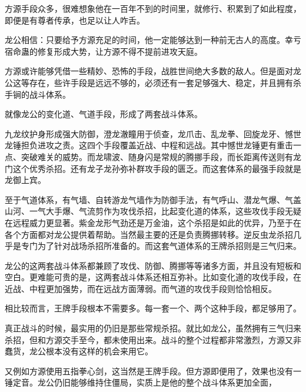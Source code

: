 \begin{this_body}
方源手段众多，很难想象他在一百年不到的时间里，就修行、积累到了如此程度，即便是有尊者传承，也足以让人咋舌。

龙公相信：只要给予方源充足的时间，他一定能够达到一种前无古人的高度。幸亏宿命蛊的修复形成大势，让方源不得不提前进攻天庭。

方源或许能够凭借一些精妙、恐怖的手段，战胜世间绝大多数的敌人。但是面对龙公这等存在，些许手段是远远不够的，必须还有一套足够强大、稳定，并且拥有杀手锏的战斗体系。

就像龙公的变化道、气道手段，形成了两套战斗体系。

九龙纹护身形成强大防御，澄龙澈瞳用于侦查，龙爪击、乱龙拳、回旋龙牙、憾世龙锤担负进攻之责。这四个手段覆盖近战、中程和远战。其中憾世龙锤更有重击一点、突破难关的威势。而龙啸波、随身闪是常规的腾挪手段，而长距离传送则有龙门这个优秀杀招。还有龙子龙孙弥补群攻手段的匮乏。而这套体系的最强手段就是龙御上宾。

至于气道体系，有气墙、自转游龙气墙作为防御手法，有气呼山、潜龙气爆、气盖山河、一气大手爆、气流剪作为攻伐杀招，比起变化道的体系，这些攻伐手段无疑在远程威力更显著。紫金龙形气劲还是万金油，这个杀招是如此的优异，乃至于在各个方面都对龙公提供着帮助。当然最主要的还是负责腾挪转移。逆反虫龙杀招几乎是专门为了针对战场杀招所准备的。而这套气道体系的王牌杀招则是三气归来。

龙公的这两套战斗体系都兼顾了攻伐、防御、腾挪等等诸多方面，并且没有短板和空白。更难能可贵的是，这两套战斗体系还相互弥补。比如变化道的攻伐手段，在近战、中程更加强势，而在远战方面薄弱。而气道的攻伐手段则恰恰相反。

相比较而言，王牌手段根本不需要多。每一套一个、两个这种手段，都足够用了。

真正战斗的时候，最实用的仍旧是那些常规杀招。就比如龙公，虽然拥有三气归来杀招，但和方源交手至今，都未使用出来。战斗的整个过程都非常激烈，方源又非蠢货，龙公根本没有这样的机会来用它。

又例如方源使用五指拳心剑，这当然是王牌手段。但方源即便用了，效果也没有一锤定音。龙公仍旧能够维持住僵局，实质上是他的整个战斗体系更加全面，

\end{this_body}

